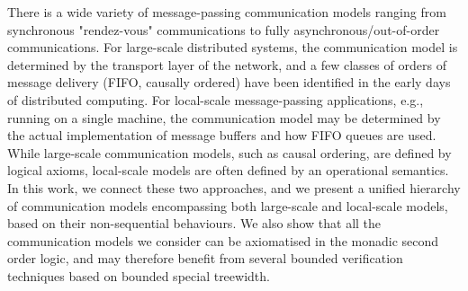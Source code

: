 There is a wide variety of message-passing communication models ranging from synchronous "rendez-vous"
communications to fully asynchronous/out-of-order communications. For large-scale distributed systems, the
communication model is determined by the transport layer of the network, and a few classes of 
orders of message delivery (FIFO, causally ordered) have been identified in the early days of 
distributed computing. For local-scale message-passing applications, 
e.g., running on a single machine, the communication model may be determined by the actual implementation of 
message buffers and how FIFO queues are used. While large-scale communication
models, such as causal ordering, are defined by logical axioms, local-scale models are often defined by an operational
semantics. In this work, we connect these two approaches, and we present a unified hierarchy of communication
models encompassing both large-scale and local-scale models, based on their non-sequential behaviours.
We also show that all the communication models we consider can be axiomatised in the monadic second order logic, 
and may therefore benefit from several bounded verification techniques based on bounded special treewidth.
